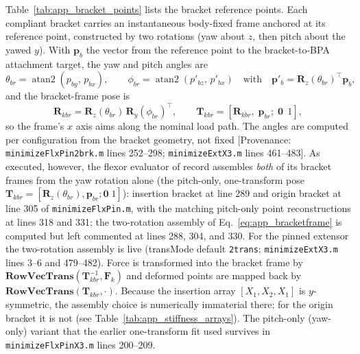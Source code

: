 Table~\ref{tab:app_bracket_points} lists the bracket reference points. Each compliant bracket carries an instantaneous body-fixed frame anchored at its reference point, constructed by two rotations (yaw about $z$, then pitch about the yawed $y$). With $\mathbf{p}_{b}$ the vector from the reference point to the bracket-to-BPA attachment target, the yaw and pitch angles are
\begin{equation}
    \theta_{br} = \operatorname{atan2}(p_{by},\, p_{bx}),
    \qquad
    \phi_{br} = \operatorname{atan2}(p'_{bz},\, p'_{bx})
    \quad\text{with}\quad
    \mathbf{p}'_{b} = \mathbf{R}_{z}(\theta_{br})^{\top}\mathbf{p}_{b},
    \label{eq:app_bracketangles}
\end{equation}
and the bracket-frame pose is
\begin{equation}
    \mathbf{R}_{kbr} = \mathbf{R}_{z}(\theta_{br})\,\mathbf{R}_{y}(\phi_{br})^{\top},
    \qquad
    \mathbf{T}_{kbr} = \left[\mathbf{R}_{kbr},\; \mathbf{p}_{br};\; \mathbf{0}\;\,1\right],
    \label{eq:app_bracketframe}
\end{equation}
so the frame's $x$ axis aims along the nominal load path. The angles are computed per configuration from the bracket geometry, not fixed [Provenance: \texttt{minimizeFlxPin2brk.m} lines 252--298; \texttt{minimizeExtX3.m} lines 461--483]. As executed, however, the flexor evaluator of record assembles \emph{both} of its bracket frames from the yaw rotation alone (the pitch-only, one-transform pose $\mathbf{T}_{kbr} = [\mathbf{R}_{z}(\theta_{br}), \mathbf{p}_{br}; \mathbf{0}\;1]$): insertion bracket at line 289 and origin bracket at line 305 of \texttt{minimizeFlxPin.m}, with the matching pitch-only point reconstructions at lines 318 and 331; the two-rotation assembly of Eq.~\eqref{eq:app_bracketframe} is computed but left commented at lines 288, 304, and 330. For the pinned extensor the two-rotation assembly is live (transMode default \texttt{2trans}; \texttt{minimizeExtX3.m} lines 3--6 and 479--482). Force is transformed into the bracket frame by $\mathbf{RowVecTrans}(\mathbf{T}_{kbr}^{-1}, \mathbf{F}_{k})$ and deformed points are mapped back by $\mathbf{RowVecTrans}(\mathbf{T}_{kbr}, \cdot)$. Because the insertion array $[X_{1},X_{2},X_{1}]$ is $y$-symmetric, the assembly choice is numerically immaterial there; for the origin bracket it is not (see Table~\ref{tab:app_stiffness_arrays}). The pitch-only (yaw-only) variant that the earlier one-transform fit used survives in \texttt{minimizeFlxPinX3.m} lines 200--209.

